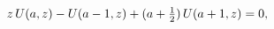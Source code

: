 \[z\mathop{U\/}\nolimits\!\left(a,z\right)-\mathop{U\/}\nolimits\!\left(a-1,z%
\right)+(a+\tfrac{1}{2})\mathop{U\/}\nolimits\!\left(a+1,z\right)=0,\]